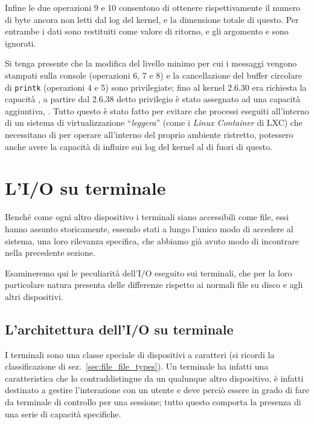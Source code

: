 Infine le due operazioni 9 e 10 consentono di ottenere rispettivamente il
numero di byte ancora non letti dal log del kernel, e la dimensione totale di
questo. Per entrambe i dati sono restituiti come valore di ritorno, e gli
argomento  e  sono ignorati.

Si tenga presente che la modifica del livello minimo per cui i messaggi
vengono stampati sulla console (operazioni 6, 7 e 8) e la cancellazione del
buffer circolare di \texttt{printk} (operazioni 4 e 5) sono privilegiate; fino
al kernel 2.6.30 era richiesta la capacità , a partire
dal 2.6.38 detto privilegio è stato assegnato ad una capacità aggiuntiva,
. Tutto questo è stato fatto per evitare che processi
eseguiti all'interno di un sistema di virtualizzazione ``\textsl{leggera}''
(come i \textit{Linux Container} di LXC) che necessitano di
 per operare all'interno del proprio ambiente
ristretto, potessero anche avere la capacità di influire sui log del kernel
al di fuori di questo.




\section{L'I/O su terminale}
\label{sec:sess_terminal_io}

Benché come ogni altro dispositivo i terminali siano accessibili come file,
essi hanno assunto storicamente, essendo stati a lungo l'unico modo di
accedere al sistema, una loro rilevanza specifica, che abbiamo già avuto modo
di incontrare nella precedente sezione.

Esamineremo qui le peculiarità dell'I/O eseguito sui terminali, che per la
loro particolare natura presenta delle differenze rispetto ai normali file su
disco e agli altri dispositivi.



\subsection{L'architettura dell'I/O su terminale}
\label{sec:term_io_design}

I terminali sono una classe speciale di dispositivi a caratteri (si ricordi la
classificazione di sez.~\ref{sec:file_file_types}). Un terminale ha infatti
una caratteristica che lo contraddistingue da un qualunque altro dispositivo,
è infatti destinato a gestire l'interazione con un utente e deve perciò essere
in grado di fare da terminale di controllo per una sessione; tutto questo
comporta la presenza di una serie di capacità specifiche.

